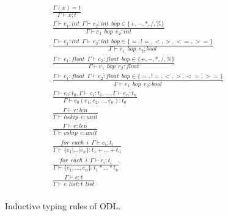 \begin{figure}[ht]
\begin{align*}
  \tag{T-VARIABLE}
  &\frac
  {\Gamma(x)=t}
  {\Gamma \vdash x:t}\\
  \tag{T-INT ARITH}
  &\frac
  {\Gamma \vdash e_1:int ~~ \Gamma \vdash e_2:int ~~ bop \in \{+,-,*,/,\%\}}
  {\Gamma \vdash e_1 ~~ bop ~~ e_2 :int} \\
  \tag{T-INT REL}
  &\frac
  {\Gamma \vdash e_1:int ~~ \Gamma \vdash e_2:int ~~ bop \in \{=, !=, <, >, <=, >=\}}
  {\Gamma \vdash e_1 ~~ bop ~~ e_2 :bool} \\
  \tag{T-FLOAT ARITH}
  &\frac
  {\Gamma \vdash e_1:float ~~ \Gamma \vdash e_2:float ~~ bop \in \{+,-,*,/,\%\}}
  {\Gamma \vdash e_1 ~~ bop ~~ e_2 :float}\\
  \tag{T-FLOAT REL}
  &\frac
  {\Gamma \vdash e_1:float ~~ \Gamma \vdash e_2:float ~~ bop \in \{=, !=, <, >, <=, >=\}}
  {\Gamma \vdash e_1 ~~ bop ~~ e_2 :bool}\\
  \tag{T-CONSTRAINT}
  &\frac
  {\Gamma \vdash e_0:t_0, \Gamma \vdash e_1:t_1, ..., \Gamma \vdash e_n:t_n}
  {\Gamma \vdash e_0(e_1, e_2, ..., e_n):t_0}\\
  \tag{T-HSKIP}
  &\frac
  {\Gamma \vdash e:len}
  {\Gamma \vdash hskip ~~ e:unit}\\
  \tag{T-VSKIP}
  &\frac
  {\Gamma \vdash e:len}
  {\Gamma \vdash vskip ~~ e:unit}\\
  \tag{T-UNION}
  &\frac
  {for ~~ each ~~ i ~~ \Gamma \vdash e_i:t_i }
  {\Gamma \vdash \{e_1|...|e_n\}:t_1+...+t_n}\\
  \tag{T-STRUCT}
  &\frac
  {for ~~ each ~~ i ~~ \Gamma \vdash e_i:t_i }
  {\Gamma \vdash \{e_1, ..., e_n\}:t_1*...*t_n}\\
  \tag{T-LIST}
  &\frac
  {\Gamma \vdash e:t}
  {\Gamma \vdash e~~list:t~~list}\\
\end{align*}
\caption{Inductive typing rules of ODL.}\label{fig:typingrule}
\end{figure}
